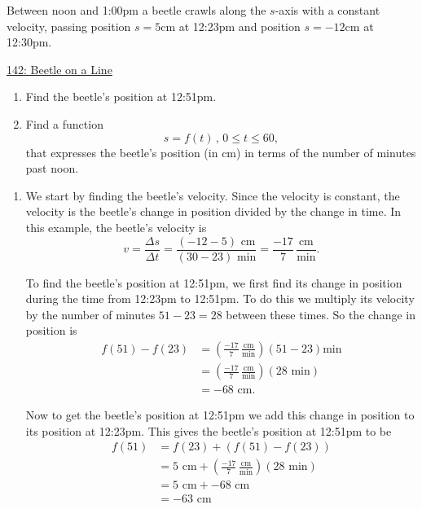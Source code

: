 \documentclass{ximera}
\begin{document}
\begin{example} \label{Ex:lfle0311}
Between noon and 1:00pm a beetle crawls along the $s$-axis with a constant velocity, passing position $s=5$cm at 12:23pm and position $s=-12$cm at 12:30pm.

\begin{onlineOnly}
    \begin{center}
\end{center}
\end{onlineOnly}

\href{https://www.desmos.com/calculator/ddf6exycnx}{142: Beetle on a Line}


\begin{enumerate}
\item Find the beetle's position at 12:51pm.

\item Find a function
\[
      s= f(t) \, , \, 0\leq t \leq 60,
\] 
that expresses the beetle's position (in cm) in terms of the number of minutes past noon.

\end{enumerate}

\begin{explanation}
\begin{enumerate}
\item We start by finding the beetle's velocity. Since the velocity is constant, the velocity is the beetle's change in position divided by the change in time. In this example, the beetle's velocity is
\[
  v = \frac{\Delta s}{\Delta t} = \frac{(-12 - 5) \text{ cm}}{(30-23)\text{ min}} = \frac{-17}{7} \, \frac{\text{cm}}{\text{min}}. 
\]

To find the beetle's position at 12:51pm, we first find its change in position during the time from 12:23pm to 12:51pm. To do this we multiply its velocity by the number of minutes $51 - 23 = 28$ between these times. So the change in position is
\begin{align*}
      f(51) - f(23) &= \left(  \frac{-17}{7} \, \frac{\text{cm}}{\text{min}} \right) \left( 51 - 23\right) \text{min} \\
                        &= \left(  \frac{-17}{7} \, \frac{\text{cm}}{\text{min}} \right) \left( 28 \text{ min} \right)  \\
                        &= -68 \text{ cm}.
\end{align*}

Now to get the beetle's position at 12:51pm we add this change in position to its position at 12:23pm. This gives the beetle's position at 12:51pm to be
\begin{align*}
    f(51) &= f(23) + (f(51) - f(23))\\
            &= 5 \text{ cm} + \left(  \frac{-17}{7} \, \frac{\text{cm}}{\text{min}} \right) \left( 28 \text{ min} \right)  \\
            &= 5 \text{ cm} + -68 \text{ cm} \\
            &= -63 \text{ cm}
\end{align*}


\end{enumerate}
\end{explanation}
\end{example}
\end{document}
